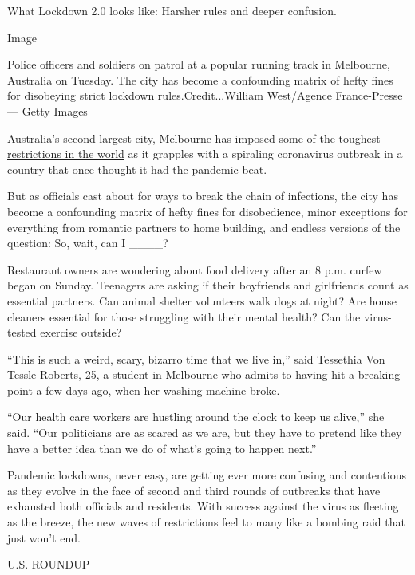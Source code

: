 What Lockdown 2.0 looks like: Harsher rules and deeper confusion.

Image

Police officers and soldiers on patrol at a popular running track in
Melbourne, Australia on Tuesday. The city has become a confounding
matrix of hefty fines for disobeying strict lockdown
rules.Credit...William West/Agence France-Presse --- Getty Images

Australia's second-largest city, Melbourne
\href{https://www.nytimes.com/2020/08/04/world/australia/coronavirus-melbourne-lockdown.html}{has
imposed some of the toughest restrictions in the world} as it grapples
with a spiraling coronavirus outbreak in a country that once thought it
had the pandemic beat.

But as officials cast about for ways to break the chain of infections,
the city has become a confounding matrix of hefty fines for
disobedience, minor exceptions for everything from romantic partners to
home building, and endless versions of the question: So, wait, can I
\_\_\_\_?

Restaurant owners are wondering about food delivery after an 8 p.m.
curfew began on Sunday. Teenagers are asking if their boyfriends and
girlfriends count as essential partners. Can animal shelter volunteers
walk dogs at night? Are house cleaners essential for those struggling
with their mental health? Can the virus-tested exercise outside?

``This is such a weird, scary, bizarro time that we live in,'' said
Tessethia Von Tessle Roberts, 25, a student in Melbourne who admits to
having hit a breaking point a few days ago, when her washing machine
broke.

``Our health care workers are hustling around the clock to keep us
alive,'' she said. ``Our politicians are as scared as we are, but they
have to pretend like they have a better idea than we do of what's going
to happen next.''

Pandemic lockdowns, never easy, are getting ever more confusing and
contentious as they evolve in the face of second and third rounds of
outbreaks that have exhausted both officials and residents. With success
against the virus as fleeting as the breeze, the new waves of
restrictions feel to many like a bombing raid that just won't end.

U.S. ROUNDUP

\hypertarget{-8}{%
\subsection{}\label{-8}}

